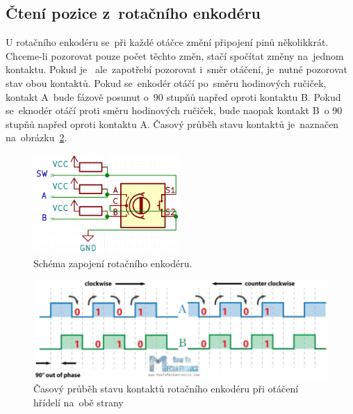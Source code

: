 

\subsection{Čtení pozice z~rotačního enkodéru}
U rotačního enkodéru se~při každé otáčce změní připojení pinů několikkrát. Chceme-li pozorovat pouze počet těchto změn, stačí spočítat změny na~jednom kontaktu. Pokud je ~ale~zapotřebí pozorovat  i~směr otáčení, je~nutné pozorovat stav obou kontaktů. Pokud se~enkodér otáčí po~směru hodinových ručiček, kontakt A~bude fázově posunut  o~90 stupňů napřed oproti kontaktu B.
Pokud se~eknodér otáčí proti směru hodinových ručiček, bude naopak kontakt  B~o 90 stupňů napřed oproti kontaktu A. Časový průběh stavu kontaktů je~naznačen na~obrázku~\ref{fig:encoder_data}.
\begin{figure}[htb]
  \centering
  \includegraphics[width=0.5\textwidth]{img/encoder-pinout.jpg}
  \caption{\label{fig:encoder-pinout} Schéma zapojení rotačního enkodéru.}
\end{figure}
\begin{figure}[htb]
  \centering
  \includegraphics[width=1\textwidth]{img/encoder_data.jpg}
  \centering
  \caption{\label{fig:encoder_data} Časový průběh stavu kontaktů rotačního enkodéru při otáčení hřídelí na~obě strany}
\end{figure}
